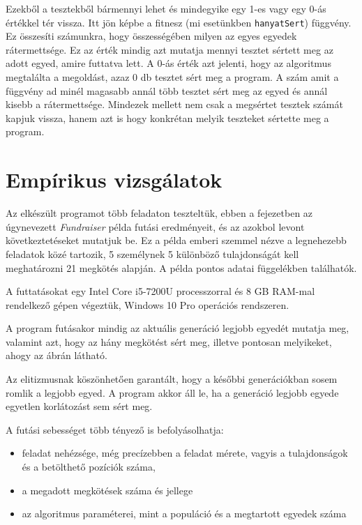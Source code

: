 \documentclass[12pt,a4paper,oneside]{report}
\begin{document}
	Ezekből a tesztekből bármennyi lehet és mindegyike egy 1-es vagy egy 0-ás értékkel tér vissza.
	Itt jön képbe a fitnesz (mi esetünkben \texttt{hanyatSert}) függvény.
	Ez összesíti számunkra, hogy összességében milyen az egyes egyedek rátermettsége.
	Ez az érték mindig azt mutatja mennyi tesztet sértett meg az adott egyed, amire futtatva lett.
	A 0-ás érték azt jelenti, hogy az algoritmus megtalálta a megoldást, azaz 0 db tesztet sért meg a program.
	A szám amit a függvény ad minél magasabb annál több tesztet sért meg az egyed és annál kisebb a rátermettsége.
	Mindezek mellett nem csak a megsértet tesztek számát kapjuk vissza, hanem azt is hogy konkrétan melyik teszteket sértette meg a program.


\chapter{Empírikus vizsgálatok} %
    Az elkészült programot több feladaton teszteltük, ebben a fejezetben az úgynevezett \emph{Fundraiser} példa futási eredményeit, és az azokbol levont következtetéseket mutatjuk be.
    Ez a példa emberi szemmel nézve a legnehezebb feladatok közé tartozik, 5 személynek 5 különböző tulajdonságát kell meghatározni 21 megkötés alapján.
    A példa pontos adatai  függelékben találhatók.

    A futtatásokat egy Intel Core i5-7200U processzorral és 8 GB RAM-mal rendelkező gépen végeztük, Windows 10 Pro operációs rendszeren.

	A program futásakor mindig az aktuális generáció legjobb egyedét mutatja meg, valamint azt, hogy az hány megkötést sért meg, illetve pontosan melyikeket, ahogy az   ábrán látható.


	Az elitizmusnak köszönhetően garantált, hogy a későbbi generációkban sosem romlik a legjobb egyed.
    A program akkor áll le, ha a generáció legjobb egyede egyetlen korlátozást sem sért meg.

	A futási sebességet több tényező is befolyásolhatja:
	\begin{itemize}
        \item feladat nehézsége, még precízebben a feladat mérete, vagyis a tulajdonságok és a betölthető pozíciók száma,
        \item a megadott megkötések száma és jellege
        \item az algoritmus paraméterei, mint a populáció és a megtartott egyedek száma
	\end{itemize}
\end{document}
